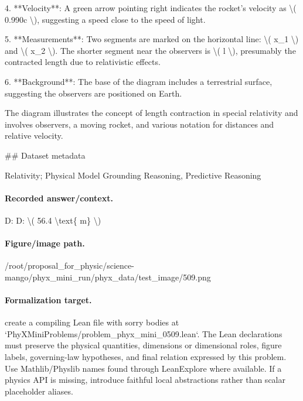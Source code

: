 4. **Velocity**: A green arrow pointing right indicates the rocket's velocity as \textbackslash{}( 0.990c \textbackslash{}), suggesting a speed close to the speed of light.

5. **Measurements**: Two segments are marked on the horizontal line: \textbackslash{}( x\_1 \textbackslash{}) and \textbackslash{}( x\_2 \textbackslash{}). The shorter segment near the observers is \textbackslash{}( l \textbackslash{}), presumably the contracted length due to relativistic effects.

6. **Background**: The base of the diagram includes a terrestrial surface, suggesting the observers are positioned on Earth.

The diagram illustrates the concept of length contraction in special relativity and involves observers, a moving rocket, and various notation for distances and relative velocity.

\#\# Dataset metadata

Relativity; Physical Model Grounding Reasoning, Predictive Reasoning

\paragraph{Recorded answer/context.}
D: D: \textbackslash{}( 56.4 \textbackslash{}text\{ m\} \textbackslash{})

\paragraph{Figure/image path.}
/root/proposal\_for\_physic/science-mango/phyx\_mini\_run/phyx\_data/test\_image/509.png

\paragraph{Formalization target.}
create a compiling Lean file with sorry bodies at `PhyXMiniProblems/problem\_phyx\_mini\_0509.lean`. The Lean declarations must preserve the physical quantities, dimensions or dimensional roles, figure labels, governing-law hypotheses, and final relation expressed by this problem.
Use Mathlib/Physlib names found through LeanExplore where available. If a physics API is missing, introduce faithful local abstractions rather than scalar placeholder aliases.

